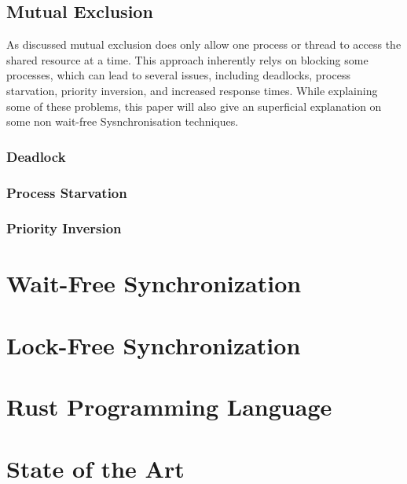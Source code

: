 \subsection{Mutual Exclusion}\label{subsec:mutual-exclusion}

As discussed mutual exclusion does only allow one process or thread to access the shared resource at a time. This approach inherently relys on blocking some processes, which can lead to several issues, including deadlocks, process starvation, priority inversion, and increased response times. While explaining some of these problems, this paper will also give an superficial explanation on some non wait-free Sysnchronisation techniques. \cite{brandenburg2019multiprocessorrealtimelockingprotocols}

\subsubsection{Deadlock}\label{subsubsec:deadlock}



\subsubsection{Process Starvation}\label{subsubsec:process-starvation}



\subsubsection{Priority Inversion}\label{subsubsec:priority-inversion}

\section{Wait-Free Synchronization}\label{sec:wait-free}

\section{Lock-Free Synchronization}\label{sec:lock-free}

\section{Rust Programming Language}\label{sec:rust}

\section{State of the Art}\label{sec:state-of-the-art}